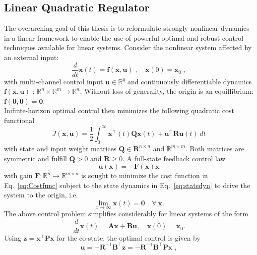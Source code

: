 \subsection{Linear Quadratic Regulator}
\label{sec:lqr}
The overarching goal of this thesis is to reformulate strongly nonlinear dynamics in a linear framework to enable the use of powerful optimal and robust control techniques available for linear systems. Consider the nonlinear system affected by an external input:
\begin{equation}
\label{eq:statedyn}
    \frac{d}{dt}\mathbf{x}(t) = \mathbf{f}(\mathbf{x,u})\;, \quad \mathbf{x}(0) = \mathbf{x}_0 \;,
\end{equation}
with multi-channel control input $\mathbf{u} \in \mathbb{R}^q$ and continuously differentiable dynamics $\mathbf{f(x,u)}$ : $\mathbb{R}^n \times \mathbb{R}^m \rightarrow \mathbb{R}^n$. Without loss of generality, the origin is an equillibrium: $\mathbf{f(0,0) = 0}$.\\
Inifinte-horizon optimal control then minimizes the following quadratic cost functional 
\begin{equation}
\label{eq:Costfunc}
    J(\mathbf{x,u}) = \frac{1}{2}\int_0^\infty \mathbf{x}^\top (t)\mathbf{Qx}(t) + \mathbf{u}^\top\mathbf{Ru}(t)~dt
\end{equation}
with state and input weight matrices $\mathbf{Q} \in \mathbf{R}^{n\times n}$ and $\mathbb{R}^{m\times m}$. Both matrices are symmetric and fulfill $\mathbf{Q} > 0$ and $\mathbf{R} \geq 0$. A full-state feedback control law
\begin{equation}
    \mathbf{u(x)} = -\mathbf{F(x)x}
\end{equation}
with gain $\mathbf{F}: \mathbb{R}^n \rightarrow \mathbb{R}^{m\times n}$ is sought to minimize the cost function in Eq.~\ref{eq:Costfunc} subject to the state dynamics in Eq.~\ref{eq:statedyn} to drive the system to the origin, i.e. \[\lim_{x\to\infty} \mathbf{x}(t) = \mathbf{0} \quad \forall ~\mathbf{x}.\]  
The above control problem simplifies considerably for linear systems of the form
\begin{equation}
    \frac{d}{dt}\mathbf{x}(t) = \mathbf{Ax} + \mathbf{Bu}, \quad \mathbf{x}(0) = \mathbf{x}_0.
\end{equation}
Using $\mathbf{z} = \mathbf{x}^\top\mathbf{Px}$ for the co-state, the optimal control is given by
\begin{equation}
    \mathbf{u} = \mathbf{-R}^{-1}\mathbf{B}^\top\mathbf{z} = \mathbf{-R}^{-1}\mathbf{B}^\top\mathbf{Px} \;, 
\end{equation}
